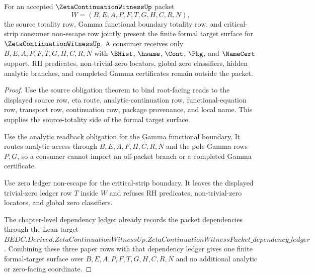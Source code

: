\begin{theorem}
\label{thm:zeta-continuation-witness-formal-target-ledger}
For an accepted $\ZetaContinuationWitnessUp$ packet
$$
W=(B,E,A,P,F,T,G,H,C,R,N),
$$
the source totality row, Gamma functional boundary totality row, and critical-strip consumer non-escape row jointly present the finite formal target surface for $\ZetaContinuationWitnessUp$. A consumer receives only $B,E,A,P,F,T,G,H,C,R,N$ with $\BHist$, $\hsame$, $\Cont$, $\Pkg$, and $\NameCert$ support. RH predicates, non-trivial-zero locators, global zero classifiers, hidden analytic branches, and completed Gamma certificates remain outside the packet.
\end{theorem}
\begin{proof}
Use the source obligation theorem to bind root-facing reads to the displayed source row, eta route, analytic-continuation row, functional-equation row, transport row, continuation row, package provenance, and local name. This supplies the source-totality side of the formal target surface.

Use the analytic readback obligation for the Gamma functional boundary. It routes analytic access through $B,E,A,F,H,C,R,N$ and the pole-Gamma rows $P,G$, so a consumer cannot import an off-packet branch or a completed Gamma certificate.

Use zero ledger non-escape for the critical-strip boundary. It leaves the displayed trivial-zero ledger row $T$ inside $W$ and refuses RH predicates, non-trivial-zero locators, and global zero classifiers.

The chapter-level dependency ledger already records the packet dependencies through the Lean target $BEDC.Derived.ZetaContinuationWitnessUp.ZetaContinuationWitnessPacket\_dependency\_ledger$. Combining these three paper rows with that dependency ledger gives one finite formal-target surface over $B,E,A,P,F,T,G,H,C,R,N$ and no additional analytic or zero-facing coordinate.
\end{proof}

